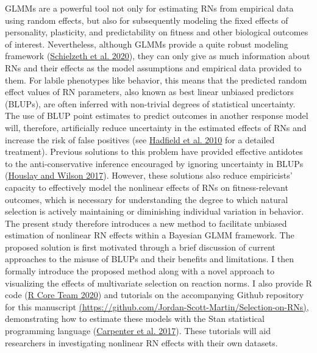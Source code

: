 \documentclass{article}
\begin{document}
GLMMs are a powerful tool not only for estimating RNs from empirical
data using random effects, but also for subsequently modeling the fixed
effects of personality, plasticity, and predictability on fitness and
other biological outcomes of interest. Nevertheless, although GLMMs
provide a quite robust modeling framework
(\protect\hyperlink{ref-Schiel2020}{Schielzeth et al. 2020}), they can
only give as much information about RNs and their effects as the model
assumptions and empirical data provided to them. For labile phenotypes
like behavior, this means that the predicted random effect values of RN
parameters, also known as best linear unbiased predictors (BLUPs), are
often inferred with non-trivial degrees of statistical uncertainty. The
use of BLUP point estimates to predict outcomes in another response
model will, therefore, artificially reduce uncertainty in the estimated
effects of RNs and increase the risk of false positives (see
\protect\hyperlink{ref-Hadfield2010}{Hadfield et al. 2010} for a
detailed treatment). Previous solutions to this problem have provided
effective antidotes to the anti-conservative inference encouraged by
ignoring uncertainty in BLUPs (\protect\hyperlink{ref-Hous2017}{Houslay
and Wilson 2017}). However, these solutions also reduce empiricists'
capacity to effectively model the nonlinear effects of RNs on
fitness-relevant outcomes, which is necessary for understanding the
degree to which natural selection is actively maintaining or diminishing
individual variation in behavior. The present study therefore introduces
a new method to facilitate unbiased estimation of nonlinear RN effects
within a Bayesian GLMM framework. The proposed solution is first
motivated through a brief discussion of current approaches to the misuse
of BLUPs and their benefits and limitations. I then formally introduce
the proposed method along with a novel approach to visualizing the
effects of multivariate selection on reaction norms. I also provide R
code (\protect\hyperlink{ref-Rbase}{R Core Team 2020}) and tutorials on
the accompanying Github repository for this manuscript
\href{https://github.com/Jordan-Scott-Martin/Selection-on-RNs}{(https://github.com/Jordan-Scott-Martin/Selection-on-RNs)},
demonstrating how to estimate these models with the Stan statistical
programming language (\protect\hyperlink{ref-Stan}{Carpenter et al.
2017}). These tutorials will aid researchers in investigating nonlinear
RN effects with their own datasets.
\end{document}
